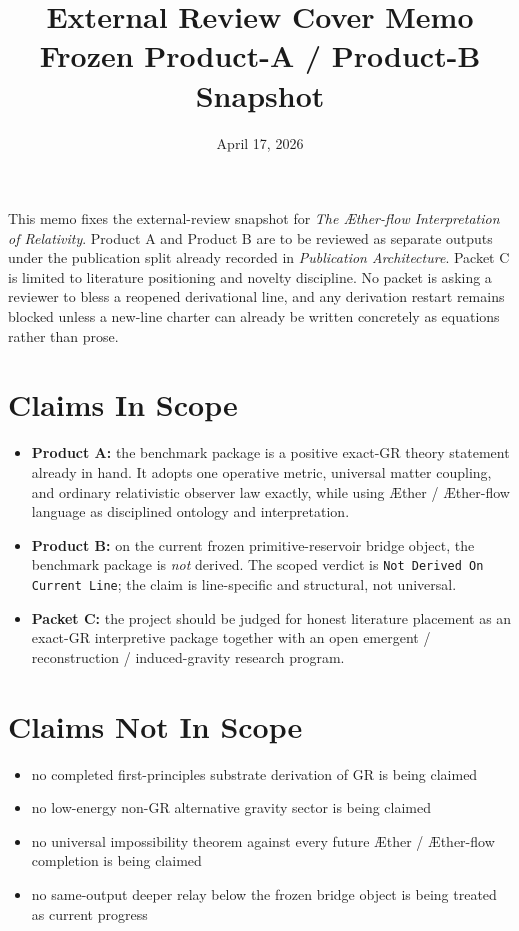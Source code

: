 \documentclass[11pt]{article}
\title{\textbf{External Review Cover Memo}\\[0.35em]
\large Frozen Product-A / Product-B Snapshot}
\author{}
\date{April 17, 2026}
\newcommand{\Aether}{\AE{}ther}
\newcommand{\Aflow}{\AE{}ther-flow}
\newcommand{\TheoryName}{\Aflow{} Interpretation of Relativity}
\begin{document}
\maketitle

This memo fixes the external-review snapshot for \emph{The \TheoryName{}}. Product A and Product B are to be reviewed as separate outputs under the publication split already recorded in \emph{Publication Architecture}. Packet C is limited to literature positioning and novelty discipline. No packet is asking a reviewer to bless a reopened derivational line, and any derivation restart remains blocked unless a new-line charter can already be written concretely as equations rather than prose.

\section*{Claims In Scope}
\begin{itemize}
    \item \textbf{Product A:} the benchmark package is a positive exact-GR theory statement already in hand. It adopts one operative metric, universal matter coupling, and ordinary relativistic observer law exactly, while using \Aether{} / \Aflow{} language as disciplined ontology and interpretation.
    \item \textbf{Product B:} on the current frozen primitive-reservoir bridge object, the benchmark package is \emph{not} derived. The scoped verdict is \texttt{Not Derived On Current Line}; the claim is line-specific and structural, not universal.
    \item \textbf{Packet C:} the project should be judged for honest literature placement as an exact-GR interpretive package together with an open emergent / reconstruction / induced-gravity research program.
\end{itemize}

\section*{Claims Not In Scope}
\begin{itemize}
    \item no completed first-principles substrate derivation of GR is being claimed
    \item no low-energy non-GR alternative gravity sector is being claimed
    \item no universal impossibility theorem against every future \Aether{} / \Aflow{} completion is being claimed
    \item no same-output deeper relay below the frozen bridge object is being treated as current progress
\end{itemize}
\end{document}
